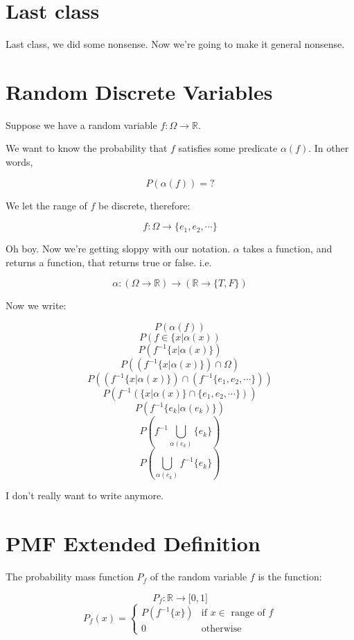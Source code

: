 \documentclass{article}
\newcommand{\inv}[1]{#1^{-1}}
\begin{document}
\section*{Last class}

Last class, we did some nonsense. Now we're going to make it general
nonsense.

\section*{Random Discrete Variables}

Suppose we have a random variable $f:\Omega\rightarrow\mathbb{R}$.

We want to know the probability that $f$ satisfies some predicate
$\alpha(f)$. In other words,

\[
P(\alpha(f))=?
\]

We let the range of $f$ be discrete, therefore:

\[
f:\Omega\rightarrow\{e_1,e_2,\cdots\}
\]

Oh boy. Now we're getting sloppy with our notation. $\alpha$ takes a
function, and returns a function, that returns true or false. i.e.

\[
\alpha:(\Omega\rightarrow\mathbb{R})\rightarrow(\mathbb{R}\rightarrow\{T,F\})
\]

Now we write:

\[
P(\alpha(f))
\] \[
P(f\in\{x|\alpha(x))
\] \[
P(\inv{f}\{x|\alpha(x)\})
\] \[
P((\inv{f}\{x|\alpha(x)\})\cap\Omega)
\] \[
P((\inv{f}\{x|\alpha(x)\})\cap(\inv{f}\{e_1,e_2,\cdots\}))
\] \[
P(\inv{f}(\{x|\alpha(x)\}\cap\{e_1,e_2,\cdots\}))
\] \[
P(\inv{f}\{e_k|\alpha(e_k)\})
\] \[
P\left(\inv{f}\bigcup\limits_{\alpha(e_k)}\{e_k\}\right)
\] \[
P\left(\bigcup\limits_{\alpha(e_k)}\inv{f}\{e_k\}\right)
\]

I don't really want to write anymore.

\section*{PMF Extended Definition}

The probability mass function $P_f$ of the random variable $f$ is the
function:

\[
P_f:\mathbb{R}\rightarrow\lbrack 0,1\rbrack
\] \[
P_f(x) = \begin{cases}
P(\inv{f}\{x\}) & \text{if $x\in$ range of $f$} \\
0               & \text{otherwise}
\end{cases}
\]
\end{document}
